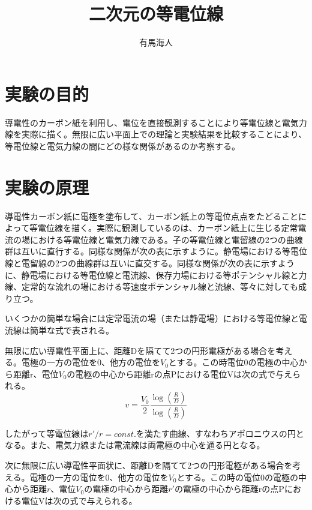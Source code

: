 \documentclass{jsarticle}
\begin{document}
\title{二次元の等電位線}
\author{有馬海人}
\maketitle

\section{実験の目的}
導電性のカーボン紙を利用し、電位を直接観測することにより等電位線と電気力線を実際に描く。無限に広い平面上での理論と実験結果を比較することにより、等電位線と電気力線の間にどの様な関係があるのか考察する。

\section{実験の原理}
導電性カーボン紙に電極を塗布して、カーボン紙上の等電位点点をたどることによって等電位線を描く。実際に観測しているのは、カーボン紙上に生じる定常電流の場における等電位線と電気力線である。子の等電位線と電留線の2つの曲線群は互いに直行する。同様な関係が次の表に示すように。静電場における等電位線と電留線の2つの曲線群は互いに直交する。同様な関係が次の表に示すように、静電場における等電位線と電流線、保存力場における等ポテンシャル線と力線、定常的な流れの場における等速度ポテンシャル線と流線、等々に対しても成り立つ。\\
\par いくつかの簡単な場合には定常電流の場（または静電場）における等電位線と電流線は簡単な式で表される。\\
\par 無限に広い導電性平面上に、距離Dを隔てて2つの円形電極がある場合を考える。電極の一方の電位を0、他方の電位を$V_0$とする。この時電位0の電極の中心から距離r、電位$V_0$の電極の中心から距離rの点Pにおける電位Vは次の式で与えられる。\\


\begin{equation}
\label{4.1}
	v = \frac{V_0}{2}\frac{\log(\frac{R}{D})}{\log(\frac{R}{D})}
\end{equation}

したがって等電位線は$r'/r = const.$を満たす曲線、すなわちアポロニウスの円となる。また、電気力線または電流線は両電極の中心を通る円となる。\\
\par 次に無限に広い導電性平面状に、距離Dを隔てて2つの円形電極がある場合を考える。電極の一方の電位を0、他方の電位を$V_0$とする。この時の電位0の電極の中心から距離$r$、電位$V_0$の電極の中心から距離$r'$の電極の中心から距離rの点Pにおける電位Vは次の式で与えられる。
\end{document}
